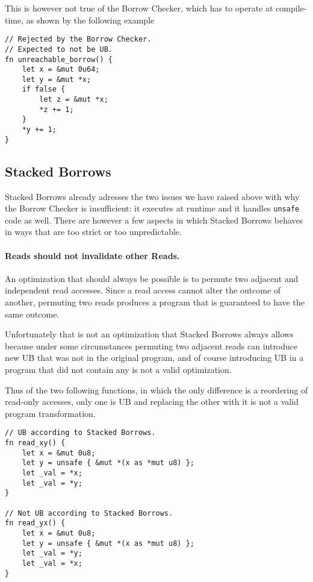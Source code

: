 \documentclass[a4paper,11pt]{article}
\theoremstyle{plain}
\theoremstyle{definition}
\theoremstyle{remark}
\begin{document}
This is however not true of the Borrow Checker, which has to operate at compile-time,
as shown by the following example
\begin{lstlisting}
// Rejected by the Borrow Checker.
// Expected to not be UB.
fn unreachable_borrow() {
    let x = &mut 0u64;
    let y = &mut *x;
    if false {
        let z = &mut *x;
        *z += 1;
    }
    *y += 1;
}
\end{lstlisting}

\subsection{Stacked Borrows}

Stacked Borrows already adresses the two issues we have raised above with
why the Borrow Checker is insufficient: it executes at runtime and it handles
\texttt{unsafe} code as well. There are however a few aspects in which
Stacked Borrows behaves in ways that are too strict or too unpredictable.

\paragraph*{Reads should not invalidate other Reads.}
An optimization that should always be possible is to permute two adjacent and independent
read accesses. Since a read access cannot alter the outcome of another, permuting
two reads produces a program that is guaranteed to have the same outcome.

Unfortunately that is not an optimization that Stacked Borrows always allows
because under some circumstances permuting two adjacent reads can introduce new
UB that was not in the original program, and of course introducing UB in a program
that did not contain any is not a valid optimization.

Thus of the two following functions, in which the only difference is a reordering
of read-only accesses, only one is UB and replacing the other with it is not
a valid program transformation.
\begin{lstlisting}
// UB according to Stacked Borrows.
fn read_xy() {
    let x = &mut 0u8;
    let y = unsafe { &mut *(x as *mut u8) };
    let _val = *x;
    let _val = *y;
}

// Not UB according to Stacked Borrows.
fn read_yx() {
    let x = &mut 0u8;
    let y = unsafe { &mut *(x as *mut u8) };
    let _val = *y;
    let _val = *x;
}
\end{lstlisting}
\end{document}
